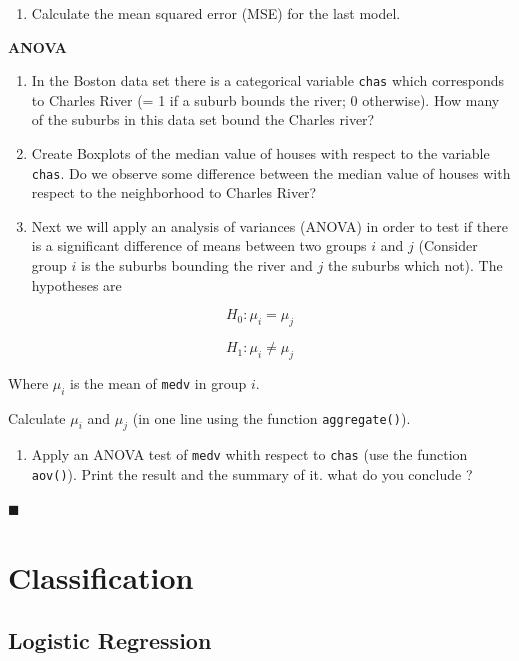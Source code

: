 \documentclass[]{book}
\providecommand{\tightlist}{%
  \setlength{\itemsep}{0pt}\setlength{\parskip}{0pt}}
\begin{document}
\begin{enumerate}
\def\labelenumi{\arabic{enumi}.}
\setcounter{enumi}{15}
\tightlist
\item
  Calculate the mean squared error (MSE) for the last model.
\end{enumerate}

\textbf{ANOVA}

\begin{enumerate}
\def\labelenumi{\arabic{enumi}.}
\setcounter{enumi}{16}
\item
  In the Boston data set there is a categorical variable \texttt{chas}
  which corresponds to Charles River (= 1 if a suburb bounds the river;
  0 otherwise). How many of the suburbs in this data set bound the
  Charles river?
\item
  Create Boxplots of the median value of houses with respect to the
  variable \texttt{chas}. Do we observe some difference between the
  median value of houses with respect to the neighborhood to Charles
  River?
\item
  Next we will apply an analysis of variances (ANOVA) in order to test
  if there is a significant difference of means between two groups \(i\)
  and \(j\) (Consider group \(i\) is the suburbs bounding the river and
  \(j\) the suburbs which not). The hypotheses are
\end{enumerate}

\[ H_0 : \mu_i = \mu_j \]

\[ H_1 : \mu_i \neq \mu_j \]

Where \(\mu_i\) is the mean of \texttt{medv} in group \(i\).

Calculate \(\mu_i\) and \(\mu_j\) (in one line using the function
\texttt{aggregate()}).

\begin{enumerate}
\def\labelenumi{\arabic{enumi}.}
\setcounter{enumi}{19}
\tightlist
\item
  Apply an ANOVA test of \texttt{medv} whith respect to \texttt{chas}
  (use the function \texttt{aov()}). Print the result and the summary of
  it. what do you conclude ?
\end{enumerate}

◼

\part{Classification}\label{part-classification}

\chapter{Logistic Regression}\label{logistic-regression}
\end{document}
